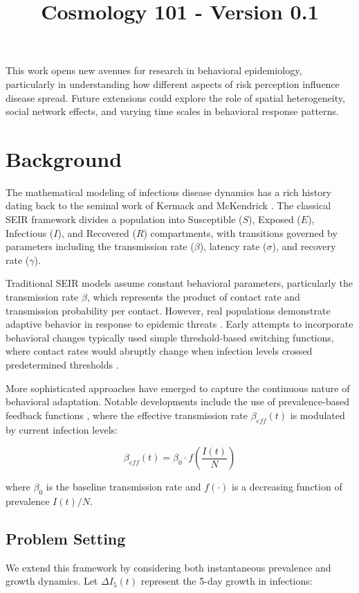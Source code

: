 \documentclass{article}\usepackage{graphicx} \usepackage{amsmath} \usepackage{colortbl}\title{Cosmology 101 - Version 0.1}
\begin{document}
This work opens new avenues for research in behavioral epidemiology, particularly in understanding how different aspects of risk perception influence disease spread. Future extensions could explore the role of spatial heterogeneity, social network effects, and varying time scales in behavioral response patterns.\section{Background}
The mathematical modeling of infectious disease dynamics has a rich history dating back to the seminal work of Kermack and McKendrick \cite{anderson1992infectious}. The classical SEIR framework divides a population into Susceptible ($S$), Exposed ($E$), Infectious ($I$), and Recovered ($R$) compartments, with transitions governed by parameters including the transmission rate ($\beta$), latency rate ($\sigma$), and recovery rate ($\gamma$).

Traditional SEIR models assume constant behavioral parameters, particularly the transmission rate $\beta$, which represents the product of contact rate and transmission probability per contact. However, real populations demonstrate adaptive behavior in response to epidemic threats \cite{funk2010modelling}. Early attempts to incorporate behavioral changes typically used simple threshold-based switching functions, where contact rates would abruptly change when infection levels crossed predetermined thresholds \cite{epstein2008coupled}.

More sophisticated approaches have emerged to capture the continuous nature of behavioral adaptation. Notable developments include the use of prevalence-based feedback functions \cite{wang2015coupled}, where the effective transmission rate $\beta_{eff}(t)$ is modulated by current infection levels:

\begin{equation}
\beta_{eff}(t) = \beta_0 \cdot f\left(\frac{I(t)}{N}\right)
\end{equation}

where $\beta_0$ is the baseline transmission rate and $f(\cdot)$ is a decreasing function of prevalence $I(t)/N$.

\subsection{Problem Setting}

We extend this framework by considering both instantaneous prevalence and growth dynamics. Let $\Delta I_5(t)$ represent the 5-day growth in infections:
\end{document}
